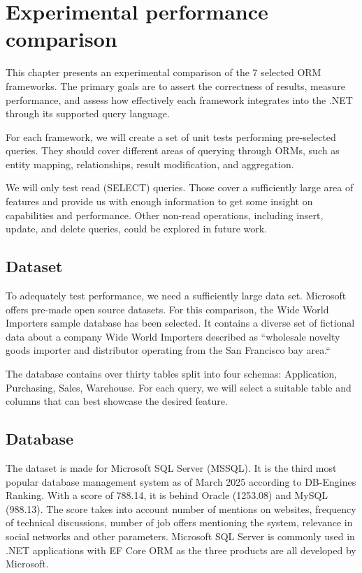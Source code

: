 \section{Experimental performance comparison}

This chapter presents an experimental comparison of the 7 selected ORM frameworks. 
The primary goals are to assert the correctness of results, measure performance, and assess how effectively each framework integrates into the .NET through its supported query language.

For each framework, we will create a set of unit tests performing pre-selected queries. They should cover different areas of querying through ORMs, such as entity mapping, relationships, result modification, and aggregation.

We will only test read (SELECT) queries. Those cover a sufficiently large area of features and provide us with enough information to get some insight on capabilities and performance. Other non-read operations, including insert, update, and delete queries, could be explored in future work.

\subsection{Dataset}\label{sec:dataset}
To adequately test performance, we need a sufficiently large data set. Microsoft offers pre-made open source datasets.
For this comparison, the Wide World Importers sample database \cite{microsoftWWI} has been selected.
It contains a diverse set of fictional data about a company Wide World Importers described as ``wholesale novelty goods importer and distributor operating from the San Francisco bay area.``\cite{microsoftWWI}

The database contains over thirty tables split into four schemas: Application, Purchasing, Sales, Warehouse. For each query, we will select a suitable table and columns that can best showcase the desired feature.

\subsection{Database}\label{sec:database}
The dataset is made for Microsoft SQL Server (MSSQL). It is the third most popular database management system as of March 2025 according to DB-Engines Ranking\cite{DBEngines2025Ranking}. With a score of 788.14, it is behind Oracle (1253.08) and MySQL (988.13). The score takes into account number of mentions on websites, frequency of technical discussions, number of job offers mentioning the system, relevance in social networks and other parameters.\cite{DBEnginesRankingMetrics} 
Microsoft SQL Server is commonly used in .NET applications with EF Core ORM as the three products are all developed by Microsoft.  


